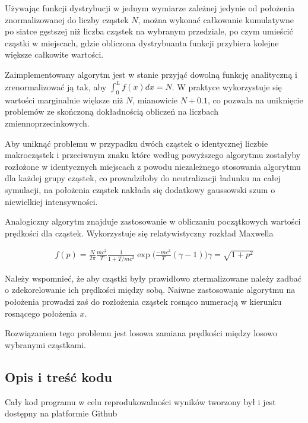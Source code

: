     Używając funkcji dystrybucji w jednym wymiarze zależnej jedynie od
    położenia znormalizowanej do liczby cząstek $N$, można wykonać całkowanie
    kumulatywne po siatce gęstszej niż liczba cząstek na wybranym przedziale,
    po czym umieścić cząstki w miejscach, gdzie obliczona dystrybuanta funkcji
    przybiera kolejne większe całkowite wartości.


    Zaimplementowany algorytm jest w stanie przyjąć dowolną funkcję analityczną
     i zrenormalizować ją tak, aby $\int_0^L
    f(x) dx = N$. W praktyce wykorzystuje się wartości marginalnie większe niż
    $N$, mianowicie $N+0.1$, co pozwala na uniknięcie problemów ze skończoną
    dokładnością obliczeń na liczbach zmiennoprzecinkowych.

    Aby uniknąć problemu w przypadku dwóch  cząstek o identycznej
    liczbie makrocząstek i przeciwnym znaku które według powyższego algorytmu
    zostałyby rozłożone w identycznych miejscach z powodu niezależnego
    stosowania algorytmu dla każdej grupy cząstek, co prowadziłoby do
    neutralizacji ładunku na całej symulacji, na położenia cząstek nakłada się
    dodatkowy gaussowski szum o niewielkiej intensywności.

    Analogiczny algorytm znajduje zastosowanie w obliczaniu początkowych
    wartości prędkości dla cząstek.  Wykorzystuje się relatywistyczny rozkład
    Maxwella

    \begin{align}
        f(p) = \frac{N}{2 \pi} \frac{mc^2}{T} \frac{1}{1+T/mc^2} \exp \Big (\frac{-mc^2}{T}(\gamma -1) \Big)
        \gamma = \sqrt{1+p^2}
        \label{relativistic-maxwell-distribution}
    \end{align}

    Należy wspomnieć, że aby cząstki były prawidłowo ztermalizowane
     należy zadbać o zdekorelowanie ich
    prędkości między sobą. Naiwne zastosowanie algorytmu na położenia prowadzi
    zaś do rozłożenia cząstek rosnąco numeracją w kierunku rosnącego położenia
    $x$.

    Rozwiązaniem tego problemu jest losowa zamiana prędkości między losowo
    wybranymi cząstkami.  

    \subsection{Opis i treść kodu}
    Cały kod programu w celu reprodukowalności wyników tworzony był i jest
    dostępny na platformie Github 

